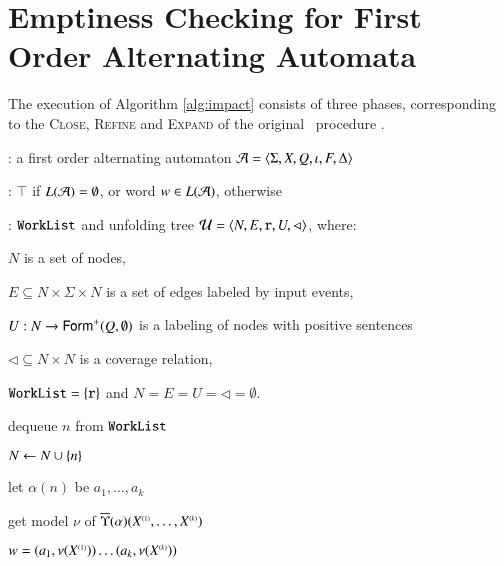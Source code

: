 \section{Emptiness Checking for First Order Alternating Automata}
\label{app:algorithm}

The execution of Algorithm \ref{alg:impact} consists of three phases,
corresponding to the \textsc{Close}, \textsc{Refine} and
\textsc{Expand} of the original \impact\ procedure \cite{McMillan06}.

\begin{algorithm}[t!]
\begin{algorithmic}[0] : a first order
  alternating automaton $\mathcal{A} = \langle \Sigma,X,Q,\iota,F,\Delta \rangle$
  
  : $\top$ if $L(\mathcal{A})=\emptyset$, or word $w \in
  L(\mathcal{A})$, otherwise

  : $\mathtt{WorkList}$ and unfolding tree
  $\mathcal{U} = \langle N,E,\mathtt{r},U,\lhd \rangle$,
  where: \begin{compactitem}
  \item $N$ is a set of nodes,
  \item $E \subseteq N \times \Sigma \times N$ is a set of edges labeled by input events,
  \item $U : N \rightarrow \mathsf{Form}^+(Q,\emptyset)$ is a labeling of
    nodes with positive sentences
  \item $\lhd \subseteq N \times N$ is a coverage relation,
  \end{compactitem}  

   $\mathtt{WorkList} = \{ \mathtt{r} \}$ and
  $N=E=U=\lhd=\emptyset$.
\end{algorithmic}
\begin{algorithmic}[1]   
  \While{$\worklist \neq \emptyset$}
  \label{ln:impact-while}

  \State dequeue $n$ from $\mathtt{WorkList}$ 
  \label{ln:impact-dequeue}

  \State $N \leftarrow N \cup \{ n \}$

  \State let $\alpha(n)$ be $a_1, \ldots, a_k$


  \State get model $\nu$ of $\overline{\Upsilon}({\alpha})({X}^{\scriptscriptstyle{({1})}}, \ldots, {X}^{\scriptscriptstyle{({k})}})$

   $w = (a_1,\nu({X}^{\scriptscriptstyle{({1})}})) \ldots (a_k,\nu({X}^{\scriptscriptstyle{({k})}}))$
  \label{ln:impact-nonempty}


\end{algorithmic}
\end{algorithm}
